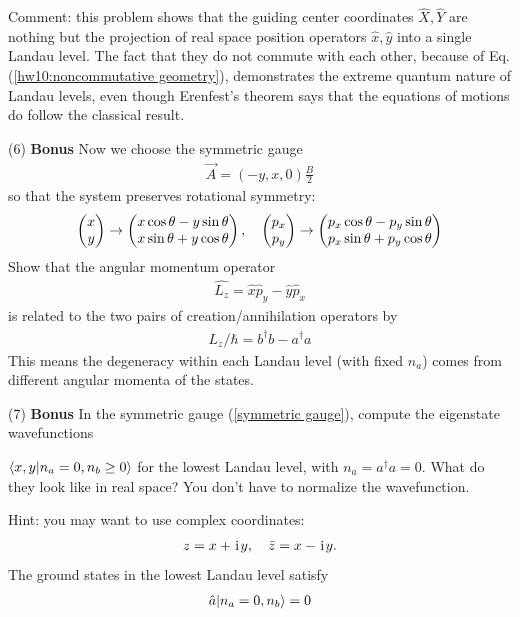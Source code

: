 Comment: this problem shows that the guiding center coordinates $\hat X,\hat Y$ are nothing but the projection of real space position operators $\hat x,\hat y$ into a single Landau level. The fact that they do not commute with each other, because of Eq.(\ref{hw10:noncommutative geometry}), demonstrates the extreme quantum nature of Landau levels, even though Erenfest's theorem says that the equations of motions do follow the classical result. 

(6) \textbf{ Bonus} Now we choose the symmetric gauge 
\begin{align}\label{symmetric gauge}
\vec A=(-y,x,0)\frac B2
\end{align}
so that the system preserves rotational symmetry:
\begin{align}
\begin{pmatrix} x\\y\end{pmatrix}\rightarrow\begin{pmatrix} x\cos\theta-y\sin\theta\\x\sin\theta+y\cos\theta\end{pmatrix},~~~\begin{pmatrix} p_x\\p_y\end{pmatrix}\rightarrow\begin{pmatrix} p_x\cos\theta-p_y\sin\theta\\p_x\sin\theta+p_y\cos\theta\end{pmatrix}
\end{align}
Show that the angular momentum operator
\begin{align}
\hat{L_z}=\hat x\hat p_y-\hat y\hat p_x
\end{align}
is related to the two pairs of creation/annihilation operators by
\begin{align}
\hat{L_z}/\hbar=b^\dagger b-a^\dagger a
\end{align}
This means the degeneracy within each Landau level (with fixed $n_a$) comes from different angular momenta of the states. 

(7) \textbf{Bonus} In the symmetric gauge (\ref{symmetric gauge}), compute the eigenstate wavefunctions 

$\langle{x,y|n_a=0,n_b\geq0}\rangle$ for the lowest Landau level, with $n_a=a^\dagger a=0$. 
What do they look like in real space? You don't have to normalize the wavefunction. 

Hint: you may want to use complex coordinates:
\begin{align}
z=x+\hspace{1pt}\mathrm{i}\hspace{1pt} y,~~~\bar z=x-\hspace{1pt}\mathrm{i}\hspace{1pt} y.
\end{align}
The ground states in the lowest Landau level satisfy
\begin{align}
\hat a|{n_a=0,n_b}\rangle=0
\end{align}